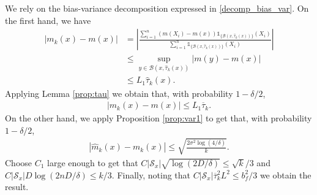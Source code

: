 We rely on the bias-variance decomposition expressed in \eqref{decomp_bias_var}. On the first hand, we have
\begin{align*}
| m _k(x) -  m  (x)| &= \left|\frac{\sum_{i=1} ^ n ( m  (X_i) -   m (x))  \mathds{1}_{\{  \mathcal{B}(x,\hat \tau_{k}(x)) \} } (X_i)  }{\sum_{i=1} ^ n \mathds{1}_{\{  \mathcal{B}(x, \hat \tau_{k}(x)) \} } (X_i)  } \right| \\
& \leq \sup_{y\in \mathcal{B}(x, \hat \tau_k(x) ) } |  m (y) -  m (x)|\\
&\leq  L_1 \hat \tau_{k} (x).
\end{align*}
Applying Lemma \ref{prop:tau} we obtain that, with probability $1-\delta/2$,
\begin{align*}
| m _k(x) - m (x)|  \leq L_1  \overline \tau_{k} .
\end{align*}
On the other hand, we apply Proposition \ref{prop:var1} to get that, with probability $1-\delta/2$,
\begin{align*}
|\hat  m _k(x) -  m _k (x)|\leq \sqrt{ \frac{2  \sigma^2 \log(4/\delta)}{k} } .
\end{align*}
Choose $C_1 $ large enough to get that $ C |\mathcal S_x| \sqrt{  \log( 2  D  /  \delta )}  \leq \sqrt k / 3 $ and $ C|\mathcal S_x|  D \log( 2 n  D  /  \delta )  \leq  k / 3 $. Finally, noting that
 $  C |\mathcal S_x|     \overline\tau_k   ^{2} L ^2    \leq   b_f^2  /3$ we obtain the result.



